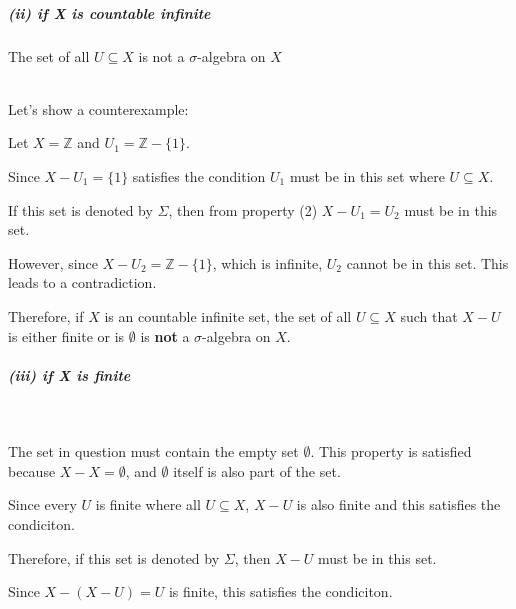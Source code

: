 \documentclass[12pt]{article}
\begin{document}
\subparagraph{(ii) if X is countable infinite}
The set of all \( U \subseteq X \) is not a \(\sigma\)-algebra on \(X\) \\ \\
\par \hspace*{1em}Let's show a counterexample: \\
\par \hspace*{1em}Let \( X = \mathbb{Z} \) and \( U_1 = \mathbb{Z} - \{1\} \). \\
\par \hspace*{1em}Since \( X - U_1 = \{1\} \) satisfies the condition \( U_1 \) must be in this set where \( U \subseteq X \).\\
\par \hspace*{1em}If this set is denoted by \( \Sigma \), then from property (2) \( X - U_1 = U_2 \) must be in this set.\\

\par \hspace*{1em}However, since \( X - U_2 = \mathbb{Z} - \{1\} \), which is infinite, \( U_2 \) cannot be in this set. This leads to a contradiction.\\

\par \hspace*{1em}Therefore, if \( X \) is an countable infinite set, the set of all \( U \subseteq X \) such that \( X - U \) is either finite or is \(\emptyset\) is \textbf{not}  a \( \sigma \)-algebra on \( X \).\\

\subparagraph{(iii) if X is finite}
\ \\
\par \hspace*{1em}The set in question must contain the empty set \( \emptyset \). This property is satisfied because \( X - X = \emptyset \), and \( \emptyset \) itself is also part of the set. \\
\par \hspace*{1em}Since every \(U\) is finite where all \( U \subseteq X \), \(X-U\) is also finite and this satisfies the condiciton. \\
\par \hspace*{1em}Therefore, if this set is denoted by \( \Sigma \), then \( X-U \) must be in this set. \\
\par \hspace*{1em}Since \( X - (X-U) = U\) is finite, this satisfies the condiciton. \\ \\
\end{document}

